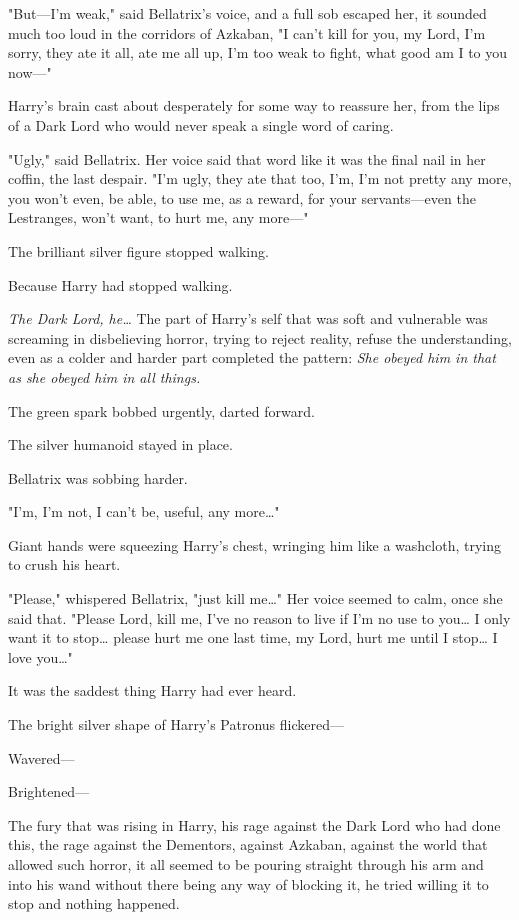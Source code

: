 "But---I'm weak," said Bellatrix's voice, and a full sob escaped her, it
sounded much too loud in the corridors of Azkaban, "I can't kill for you, my
Lord, I'm sorry, they ate it all, ate me all up, I'm too weak to fight, what
good am I to you now---"

Harry's brain cast about desperately for some way to reassure her, from the
lips of a Dark Lord who would never speak a single word of caring.

"Ugly," said Bellatrix. Her voice said that word like it was the final nail in
her coffin, the last despair. "I'm ugly, they ate that too, I'm, I'm not pretty
any more, you won't even, be able, to use me, as a reward, for your
servants---even the Lestranges, won't want, to hurt me, any more---"

The brilliant silver figure stopped walking.

Because Harry had stopped walking.

\emph{The Dark Lord, he{\ldots}} The part of Harry's self that was soft and
vulnerable was screaming in disbelieving horror, trying to reject reality,
refuse the understanding, even as a colder and harder part completed the
pattern: \emph{She obeyed him in that as she obeyed him in all things.}

The green spark bobbed urgently, darted forward.

The silver humanoid stayed in place.

Bellatrix was sobbing harder.

"I'm, I'm not, I can't be, useful, any more{\ldots}"

Giant hands were squeezing Harry's chest, wringing him like a washcloth, trying
to crush his heart.

"Please," whispered Bellatrix, "just kill me{\ldots}" Her voice seemed to calm,
once she said that. "Please Lord, kill me, I've no reason to live if I'm no use
to you{\ldots} I only want it to stop{\ldots} please hurt me one last time, my
Lord, hurt me until I stop{\ldots} I love you{\ldots}"

It was the saddest thing Harry had ever heard.

The bright silver shape of Harry's Patronus flickered---

Wavered---

Brightened---

The fury that was rising in Harry, his rage against the Dark Lord who had done
this, the rage against the Dementors, against Azkaban, against the world that
allowed such horror, it all seemed to be pouring straight through his arm and
into his wand without there being any way of blocking it, he tried willing it
to stop and nothing happened.

